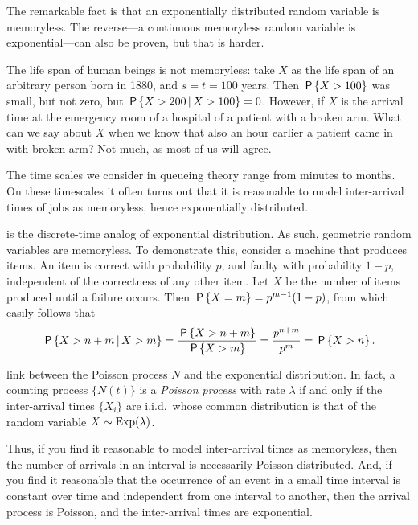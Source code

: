 The remarkable fact is that an exponentially distributed random variable is memoryless.
The reverse---a continuous memoryless random variable is exponential---can also be proven, but that is harder.

The life span of human beings is not memoryless: take $X$ as the life span of an arbitrary person born in 1880, and $s=t = 100$ years.
Then $\P{X>100}$ was small, but not zero, but $\P{X>200 \given X>100} = 0$.
However, if $X$ is the arrival time at the emergency room of a hospital of a patient with a broken arm.
What can we say about $X$ when we know that also an hour earlier a patient came in with broken arm?
Not much, as most of us will agree.

The time scales we consider in queueing theory range from minutes to months.
On these timescales it often turns out that it is reasonable to model inter-arrival times of jobs as memoryless, hence exponentially distributed.


 is the discrete-time analog of exponential distribution.
As such, geometric random variables are memoryless.
To demonstrate this, consider a machine that produces items.
An item is correct with probability $p$, and faulty with probability $1-p$, independent of the correctness of any other item.
Let $X$ be the number of items produced until a failure occurs.  Then $\P{X=m} = p^{m-1} (1-p)$, from which easily follows that 
\begin{equation}  \label{eq:81}
\P{X>n+m\given X>m} = \frac{\P{X>n+m}}{\P{X>m}} = \frac{p^{n+m}}{p^m}=\P{X>n}. 
\end{equation}


 link between the Poisson process $N$ and the exponential distribution.
In fact, a counting process $\{N(t)\}$ is a \emph{Poisson process} with rate $\lambda$ if and only if the inter-arrival times $\{X_i\}$ are i.i.d.\ whose common distribution is that of the random variable $X\sim \Exp(\lambda)$.


Thus, if you find it reasonable to model inter-arrival times as memoryless, then the number of arrivals in an interval is necessarily Poisson distributed.
And, if you find it reasonable that the occurrence of an event in a small time interval is constant over time and independent from one interval to another, then the arrival process is Poisson, and the inter-arrival times are exponential.



